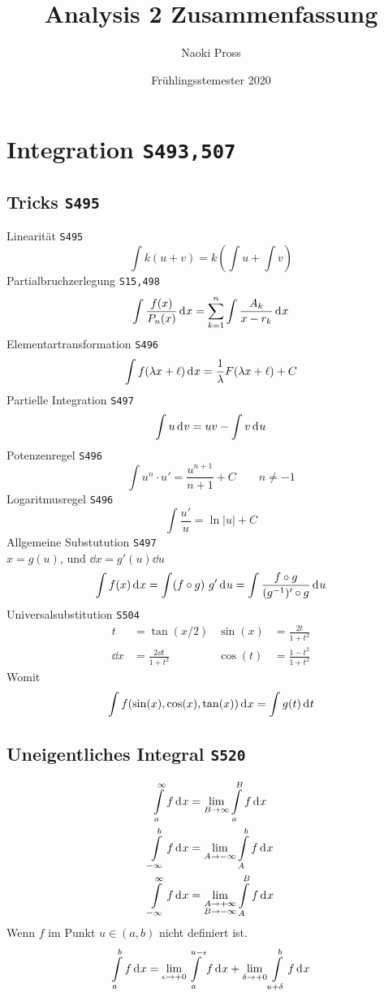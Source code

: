 \documentclass[margin=small, twocolumn]{hsrzf}
\title{Analysis 2 Zusammenfassung}
\author{Naoki Pross}
\date{Fr\"uhlingsstemester 2020}
\numberwithin{equation}{subsection}
\newcommand{\brpage}[1]{\textcolor{red!70!black}{\small\texttt{S#1}}}
\begin{document}

\section{Integration \brpage{493,507}}
\subsection{Tricks \brpage{495}}
Linearit\"at \brpage{495}
\[
    \int k(u + v) = k\left(\int u + \int v\right)
\]
Partialbruchzerlegung \brpage{15,498}
\[
    \int \frac{f(x)}{P_n(x)} \,\mathrm{d}^{} x = \sum_{k=1}^n \int \frac{A_k}{x-r_k}\,\mathrm{d}^{} x
\]
Elementartransformation \brpage{496}
\[
    \int f(\lambda x + \ell) \,\mathrm{d}^{} x = \frac{1}{\lambda} F(\lambda x + \ell) + C
\]
Partielle Integration \brpage{497}
\[
    \int u \,\mathrm{d}^{} v = uv - \int v \,\mathrm{d}^{} u
\]
Potenzenregel \brpage{496}
\[
    \int u^n \cdot u' = \frac{u^{n+1}}{n+1} + C \qquad n \neq -1
\]
Logaritmusregel \brpage{496}
\[
    \int \frac{u'}{u} = \ln|u| + C
\]
Allgemeine Substutution \brpage{497}\\
 \(x = g(u)\), und \(\dd{x} = g'(u)\dd{u}\)
\[
    \int f(x) \,\mathrm{d}^{} x = \int (f\circ g) ~ g' \,\mathrm{d}^{} u = \int \frac{f \circ g}{(g^{-1})'\circ g} \,\mathrm{d}^{} u 
\]
Universalsubstitution \brpage{504}
\begin{align*}
    t &= \tan(x/2) & \sin(x) &= \frac{2t}{1+t^2} \\
    \dd{x} &= \frac{2\dd{t}}{1+t^2} & \cos(t) &= \frac{1-t^2}{1+t^2} 
\end{align*}
Womit
\[
    \int f(\sin(x), \cos(x), \tan(x)) \,\mathrm{d}^{} x = \int g(t) \,\mathrm{d}^{} t
\]

\subsection{Uneigentliches Integral \brpage{520}}
\begin{align*}
    \int\limits_a^\infty f \,\mathrm{d}^{} x &= \lim_{B \to \infty} \int\limits_a^B f \,\mathrm{d}^{} x \\
    \int\limits_{-\infty}^b f \,\mathrm{d}^{} x &= \lim_{A \to -\infty} \int\limits_A^b f \,\mathrm{d}^{} x \\
    \int\limits_{-\infty}^\infty f \,\mathrm{d}^{} x &= \lim_{\substack{A \to +\infty \\ B \to -\infty}} \int\limits_A^B f \,\mathrm{d}^{} x
\end{align*}
Wenn \(f\) im Punkt \(u \in (a,b)\) nicht definiert ist.
\begin{equation} \label{eqn:int-with-pole}
    \int\limits_a^b f \,\mathrm{d}^{} x = 
    \lim_{\epsilon\to +0} \int\limits_a^{u-\epsilon} f \,\mathrm{d}^{} x
    + \lim_{\delta\to +0} \int\limits_{u+\delta}^b f \,\mathrm{d}^{} x
\end{equation}
\end{document}
